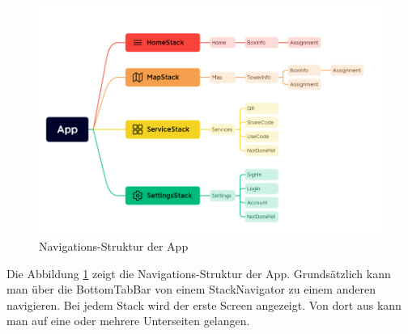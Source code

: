 \begin{figure}[H]
    \centering
    \includegraphics[width=1\textwidth]{images/appnavigation.png}
    \caption{Navigations-Struktur der App}
    \label{fig:appnavigation}
\end{figure}

Die Abbildung \ref{fig:appnavigation} zeigt die Navigations-Struktur der App. Grundsätzlich kann man über die BottomTabBar von einem StackNavigator zu einem anderen navigieren. Bei jedem Stack wird der erste Screen angezeigt. Von dort aus kann man auf eine oder mehrere Unterseiten gelangen.\\